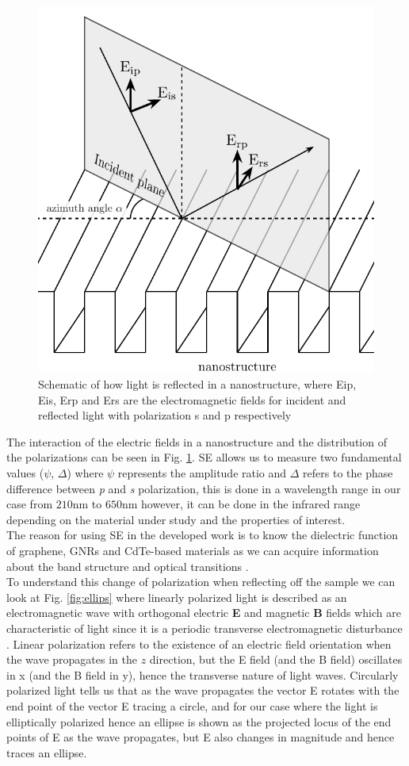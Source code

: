 \begin{figure}[H]
	\centering
	\includegraphics[width=0.5\linewidth]{FIGURES/Characterization_techniques/Nanostructure}
	\caption{Schematic of how light is reflected in a nanostructure, where Eip, Eis, Erp and Ers are the electromagnetic fields for incident and reflected light with polarization s and p respectively}
	\label{fig:sq-how to reflex}
\end{figure}

The interaction of the electric fields in a nanostructure and the distribution of the polarizations can be seen in Fig. \ref{fig:sq-how to reflex}. SE allows us to measure two fundamental values ($\psi$, $\Delta$) where $\psi$ represents the amplitude ratio and $\Delta$ refers to the phase difference between \textit{p} and \textit{s} polarization, this is done in a wavelength range in our case from $210$nm to $650$nm however, it can be done in the infrared range depending on the material under study and the properties of interest. \\
The reason for using SE in the developed work is to know the dielectric function of graphene, GNRs and CdTe-based materials as we can acquire information about the band structure and optical transitions \cite{fujiwara2007spectroscopic,weber2010optical}. \\

To understand this change of polarization when reflecting off the sample we can look at Fig. \ref{fig:ellips} where linearly polarized light is described as an electromagnetic wave with orthogonal electric \textbf{E} and magnetic \textbf{B} fields which are characteristic of light since it is a periodic transverse electromagnetic disturbance \cite{losurdo2013ellipsometry}. Linear polarization refers to the existence of an electric field orientation when the wave propagates in the $z$ direction, but the E field (and the B field) oscillates in x (and the B field in y), hence the transverse nature of light waves.  Circularly polarized light tells us that as the wave propagates the vector E rotates with the end point of the vector E tracing a circle, and for our case where the light is elliptically polarized hence an ellipse is shown as the projected locus of the end points of E as the wave propagates, but E also changes in magnitude and hence traces an ellipse. 

